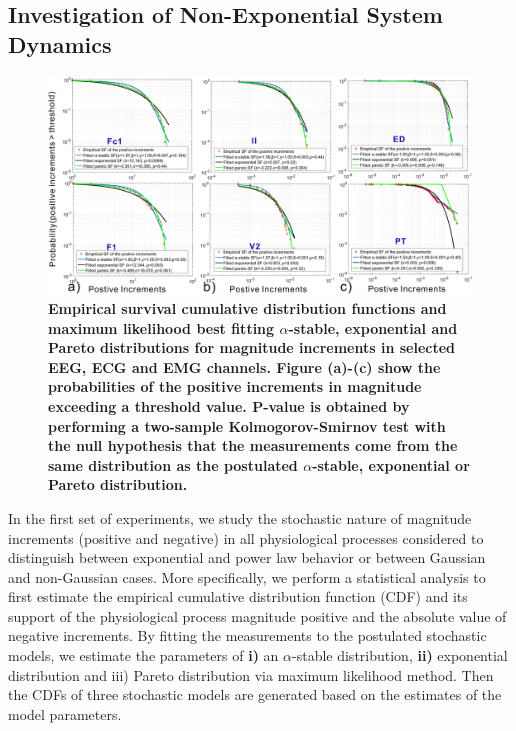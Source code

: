 \subsection{Investigation of Non-Exponential System Dynamics}
\begin{figure}[!htb]
\centering
\includegraphics[width=1\columnwidth]{stats_overall_2.eps}
\vskip -3mm
\caption{\textbf{Empirical survival cumulative distribution functions and maximum likelihood best fitting $\alpha$-stable, exponential and Pareto distributions for magnitude increments in selected EEG, ECG and EMG channels. Figure (a)-(c) show the probabilities of the positive increments in magnitude exceeding a threshold value. P-value is obtained by performing a two-sample Kolmogorov-Smirnov test with the null hypothesis that the measurements come from the same distribution as the postulated $\alpha$-stable, exponential or Pareto distribution.}}\label{fig:stat_result}
\vskip -5mm
\end{figure}  

In the first set of experiments, we study the stochastic nature of magnitude increments (positive and negative) in all physiological processes considered to distinguish between exponential and power law behavior or between Gaussian and non-Gaussian cases. More specifically, we perform a statistical analysis to first estimate the empirical cumulative distribution function (CDF) and its support of the physiological process magnitude positive and the absolute value of negative increments. By fitting the measurements to the postulated stochastic models, we estimate the parameters of \textbf{i)} an $\alpha$-stable distribution, \textbf{ii)} exponential distribution and iii) Pareto distribution via maximum likelihood method. Then the CDFs of three stochastic models are generated based on the estimates of the model parameters.  

